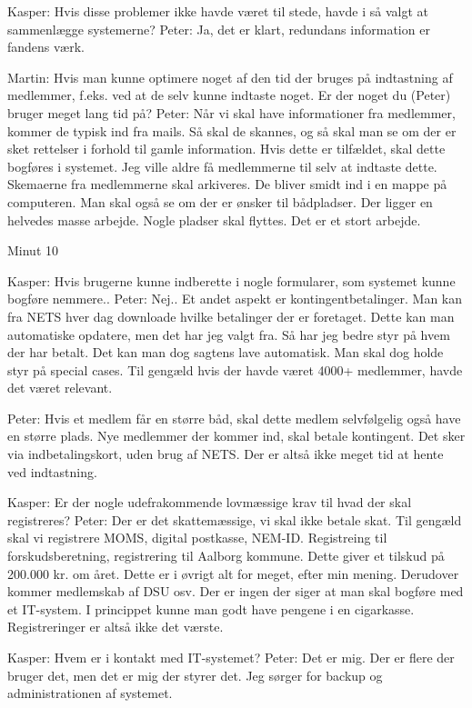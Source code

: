 Kasper: Hvis disse problemer ikke havde været til stede, havde i så valgt at sammenlægge systemerne?
Peter: Ja, det er klart, redundans information er fandens værk.

Martin: Hvis man kunne optimere noget af den tid der bruges på indtastning af medlemmer, f.eks. ved at de selv kunne indtaste noget. Er der noget du (Peter) bruger meget lang tid på?
Peter: Når vi skal have informationer fra medlemmer, kommer de typisk ind fra mails. Så skal de skannes, og så skal man se om der er sket rettelser i forhold til gamle information. Hvis dette er tilfældet, skal dette bogføres i systemet. Jeg ville aldre få medlemmerne til selv at indtaste dette. Skemaerne fra medlemmerne skal arkiveres. De bliver smidt ind i en mappe på computeren. Man skal også se om der er ønsker til bådpladser. Der ligger en helvedes masse arbejde. Nogle pladser skal flyttes. Det er et stort arbejde.

Minut 10

Kasper: Hvis brugerne kunne indberette i nogle formularer, som systemet kunne bogføre nemmere..
Peter: Nej.. Et andet aspekt er kontingentbetalinger. Man kan fra NETS hver dag downloade hvilke betalinger der er foretaget. Dette kan man automatiske opdatere, men det har jeg valgt fra. Så har jeg bedre styr på hvem der har betalt. Det kan man dog sagtens lave automatisk. Man skal dog holde styr på special cases. Til gengæld hvis der havde været 4000+ medlemmer, havde det været relevant.



Peter: Hvis et medlem får en større båd, skal dette medlem selvfølgelig også have en større plads. Nye medlemmer der kommer ind, skal betale kontingent. Det sker via indbetalingskort, uden brug af NETS. Der er altså ikke meget tid at hente ved indtastning.

Kasper: Er der nogle udefrakommende lovmæssige krav til hvad der skal registreres?
Peter: Der er det skattemæssige, vi skal ikke betale skat. Til gengæld skal vi registrere MOMS, digital postkasse, NEM-ID. Registreing til forskudsberetning, registrering til Aalborg kommune. Dette giver et tilskud på 200.000 kr. om året. Dette er i øvrigt alt for meget, efter min mening. Derudover kommer medlemskab af DSU osv. Der er ingen der siger at man skal bogføre med et IT-system. I princippet kunne man godt have pengene i en cigarkasse. Registreringer er altså ikke det værste.

Kasper: Hvem er i kontakt med IT-systemet?
Peter: Det er mig. Der er flere der bruger det, men det er mig der styrer det. Jeg sørger for backup og administrationen af systemet.

